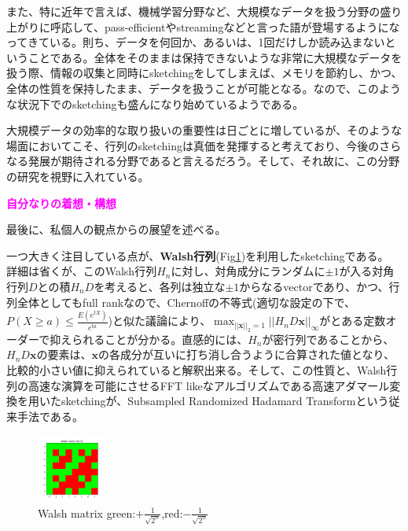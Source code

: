 \documentclass[10pt]{article}
\begin{document}
また、特に近年で言えば、機械学習分野など、大規模なデータを扱う分野の盛り上がりに呼応して、pass-efficientやstreamingなどと言った語が登場するようになってきている。則ち、データを何回か、あるいは、1回だけしか読み込まないということである。全体をそのままは保持できないような非常に大規模なデータを扱う際、情報の収集と同時にsketchingをしてしまえば、メモリを節約し、かつ、全体の性質を保持したまま、データを扱うことが可能となる\cite{libertySimpleDeterministicMatrix2013}。なので、このような状況下でのsketchingも盛んになり始めているようである。

大規模データの効率的な取り扱いの重要性は日ごとに増しているが、そのような場面においてこそ、行列のsketchingは真価を発揮すると考えており、今後のさらなる発展が期待される分野であると言えるだろう。そして、それ故に、この分野の研究を視野に入れている。

\noindent
{\bf \textcolor{magenta}{自分なりの着想・構想}}

最後に、私個人の観点からの展望を述べる。

一つ大きく注目している点が、\textbf{Walsh行列}(Fig\ref{img:Walsh})を利用したsketchingである。
詳細は省くが、このWalsh行列$H_n$に対し、対角成分にランダムに$\pm1$が入る対角行列$D$との積$H_nD$を考えると、各列は独立な$\pm1$からなるvectorであり、かつ、行列全体としてもfull rankなので、Chernoffの不等式(適切な設定の下で、$P(X \geq a ) \leq \frac{E(e^{tX})}{e^{ta}}$)と似た議論により、$\max_{||\bm{x}||_2=1}||H_nD\bm{x}||_{\infty}$がとある定数オーダーで抑えられることが分かる。直感的には、$H_n$が密行列であることから、$H_nD\bm{x}$の要素は、$\bm{x}$の各成分が互いに打ち消し合うように合算された値となり、比較的小さい値に抑えられていると解釈出来る。そして、この性質と、Walsh行列の高速な演算を可能にさせるFFT likeなアルゴリズムである高速アダマール変換を用いたsketchingが、Subsampled Randomized Hadamard Transformという従来手法である\cite{falconeMatrixSketchingSupervised2019}\cite{woodruffSketchingToolNumerical2014}\cite{ailonFastJohnsonLindenstrauss2009}。

\begin{figure}
    \vspace{-1.5\baselineskip}
    \begin{center}
        \includegraphics[width=0.2\textwidth]
        {walsh.png}
        \caption{\newline
            Walsh matrix\newline
            green:$+\frac{1}{\sqrt{2^n}}$,red:$-\frac{1}{\sqrt{2^n}}$}
        \label{img:Walsh}
    \end{center}
    \vspace{-1.5\baselineskip}
\end{figure}
\end{document}
